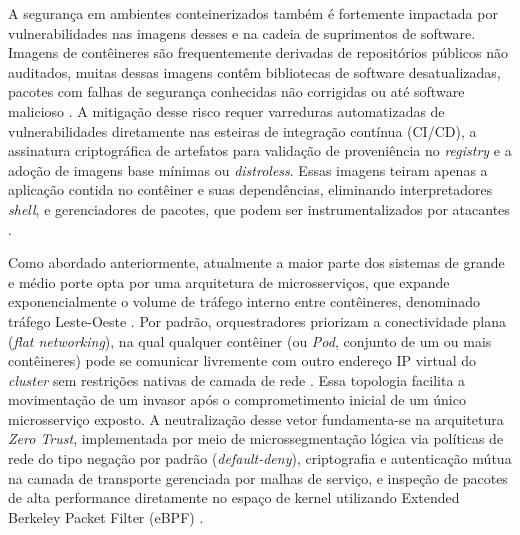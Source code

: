 A segurança em ambientes conteinerizados também é fortemente impactada por vulnerabilidades nas imagens desses e na cadeia de suprimentos de software. Imagens de contêineres são frequentemente derivadas de repositórios públicos não auditados, muitas dessas imagens contêm bibliotecas de software desatualizadas, pacotes com falhas de segurança conhecidas não corrigidas ou até software malicioso \cite{combe2016docker}. A mitigação desse risco requer varreduras automatizadas de vulnerabilidades diretamente nas esteiras de integração contínua (CI/CD), a assinatura criptográfica de artefatos para validação de proveniência no \emph{registry} e a adoção de imagens base mínimas ou \emph{distroless}. Essas imagens teiram apenas a aplicação contida no contêiner e suas dependências, eliminando interpretadores \emph{shell}, e gerenciadores de pacotes, que podem ser instrumentalizados por atacantes \cite{souppaya2017nist}.

Como abordado anteriormente, atualmente a maior parte dos sistemas de grande e médio porte opta por uma arquitetura de microsserviços, que expande exponencialmente o volume de tráfego interno entre contêineres, denominado tráfego Leste-Oeste . Por padrão, orquestradores priorizam
a conectividade plana (\emph{flat networking}), na qual qualquer contêiner (ou \emph{Pod}, conjunto de um ou mais contêineres) pode se comunicar livremente com outro endereço IP virtual do \emph{cluster} sem restrições nativas de camada de rede \cite{martin2021hacking}. Essa topologia facilita a movimentação de um invasor após o comprometimento inicial de um único microsserviço exposto. A neutralização desse vetor fundamenta-se na arquitetura \emph{Zero Trust}, implementada por meio de microssegmentação lógica via políticas de rede do tipo negação por padrão (\emph{default-deny}), criptografia e autenticação mútua na camada de transporte  gerenciada por malhas de serviço, e inspeção de pacotes de alta performance diretamente no espaço de kernel utilizando Extended Berkeley Packet Filter (eBPF) \cite{martin2021hacking}.

